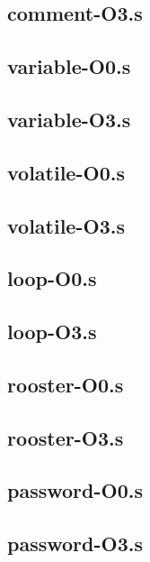 \begin{appendices}
\subsection{comment-O3.s}


\subsection{variable-O0.s}

\subsection{variable-O3.s}


\subsection{volatile-O0.s}

\subsection{volatile-O3.s}


\subsection{loop-O0.s}

\subsection{loop-O3.s}


\subsection{rooster-O0.s}

\subsection{rooster-O3.s}


\subsection{password-O0.s}

\subsection{password-O3.s}



\end{appendices}
